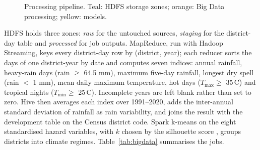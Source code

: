 \documentclass[conference]{IEEEtran}
\begin{document}
\begin{figure}[!htb]
\centering
{}
\caption{Processing pipeline. Teal: HDFS storage zones; orange: Big Data processing; yellow: models.}
\label{fig:pipe}
\end{figure}

HDFS holds three zones: \emph{raw} for the untouched sources, \emph{staging} for the district-day table and \emph{processed} for job outputs. MapReduce, run with Hadoop Streaming, keys every district-day row by (district, year); each reducer sorts the days of one district-year by date and computes seven indices: annual rainfall, heavy-rain days (rain $\ge$ 64.5 mm), maximum five-day rainfall, longest dry spell (rain $<$ 1 mm), mean daily maximum temperature, hot days ($T_{\max} \ge$ 35\,\textdegree C) and tropical nights ($T_{\min} \ge$ 25\,\textdegree C). Incomplete years are left blank rather than set to zero. Hive then averages each index over 1991--2020, adds the inter-annual standard deviation of rainfall as rain variability, and joins the result with the development table on the Census district code. Spark k-means on the eight standardised hazard variables, with $k$ chosen by the silhouette score \cite{rousseeuw1987}, groups districts into climate regimes. Table~\ref{tab:bigdata} summarises the jobs.
\end{document}
